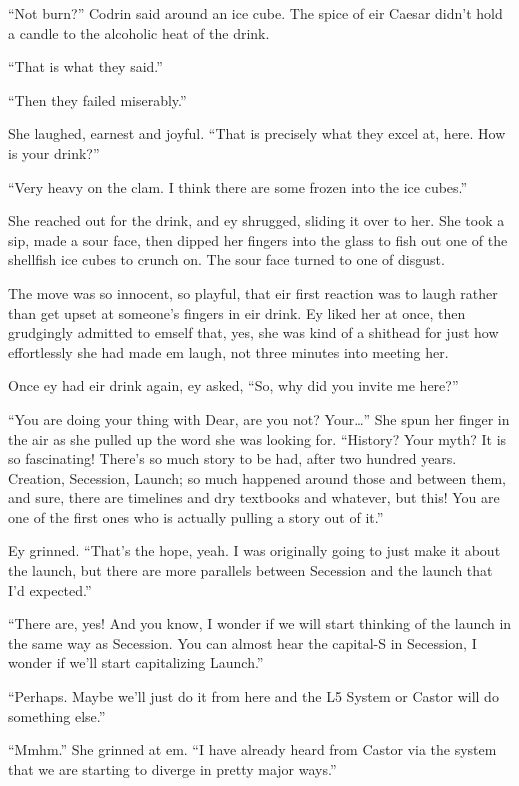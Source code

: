 ``Not burn?'' Codrin said around an ice cube. The spice of eir Caesar didn't hold a candle to the alcoholic heat of the drink.

``That is what they said.''

``Then they failed miserably.''

She laughed, earnest and joyful. ``That is precisely what they excel at, here. How is your drink?''

``Very heavy on the clam. I think there are some frozen into the ice cubes.''

She reached out for the drink, and ey shrugged, sliding it over to her. She took a sip, made a sour face, then dipped her fingers into the glass to fish out one of the shellfish ice cubes to crunch on. The sour face turned to one of disgust.

The move was so innocent, so playful, that eir first reaction was to laugh rather than get upset at someone's fingers in eir drink. Ey liked her at once, then grudgingly admitted to emself that, yes, she was kind of a shithead for just how effortlessly she had made em laugh, not three minutes into meeting her.

Once ey had eir drink again, ey asked, ``So, why did you invite me here?''

``You are doing your thing with Dear, are you not? Your\ldots{}'' She spun her finger in the air as she pulled up the word she was looking for. ``History? Your myth? It is so fascinating! There's so much story to be had, after two hundred years. Creation, Secession, Launch; so much happened around those and between them, and sure, there are timelines and dry textbooks and whatever, but this! You are one of the first ones who is actually pulling a story out of it.''

Ey grinned. ``That's the hope, yeah. I was originally going to just make it about the launch, but there are more parallels between Secession and the launch that I'd expected.''

``There are, yes! And you know, I wonder if we will start thinking of the launch in the same way as Secession. You can almost hear the capital-S in Secession, I wonder if we'll start capitalizing Launch.''

``Perhaps. Maybe we'll just do it from here and the L5 System or Castor will do something else.''

``Mmhm.'' She grinned at em. ``I have already heard from Castor via the system that we are starting to diverge in pretty major ways.''

